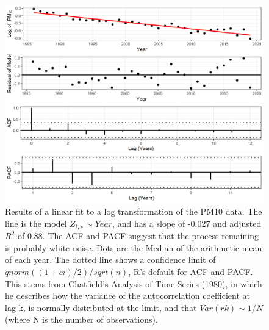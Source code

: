 \begin{figure}[ht]
\centering
\includegraphics[width = \textwidth]{Figures/explore_ts_exp_fit.png}
\caption{Results of a linear fit to a log transformation of the PM10 data.  The line is the model $Z_{t,s} \sim Year$, and has a slope of -0.027 and adjusted $R^2$ of 0.88.  The \ac{ACF} and \ac{PACF} suggest that the process remaining is probably white noise.  Dots are the Median of the arithmetic mean of each year.  The dotted line shows a confidence limit of $qnorm((1 + ci)/2)/sqrt(n)$, R's default for ACF and PACF.  This stems from Chatfield's Analysis of Time Series (1980), in which he describes how the variance of the autocorrelation coefficient at lag k, is normally distributed at the limit, and that $Var(rk) \sim 1/N$ (where N is the number of observations).}
\label{fig:explore_ts_exp_fit}
\end{figure}

